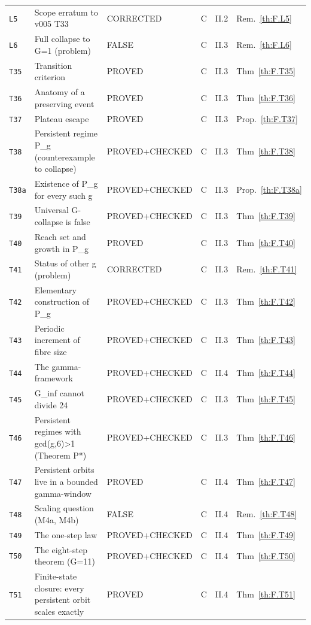 \begin{longtable}{@{}p{13mm}p{45mm}p{33mm}p{8mm}p{12mm}p{17mm}@{}}
\texttt{L5} & Scope erratum to v005 T33 & CORRECTED & C & II.2 & Rem.~\ref{th:F.L5} \\
\texttt{L6} & Full collapse to G=1 (problem) & FALSE & C & II.3 & Rem.~\ref{th:F.L6} \\
\texttt{T35} & Transition criterion & PROVED & C & II.3 & Thm~\ref{th:F.T35} \\
\texttt{T36} & Anatomy of a preserving event & PROVED & C & II.3 & Thm~\ref{th:F.T36} \\
\texttt{T37} & Plateau escape & PROVED & C & II.3 & Prop.~\ref{th:F.T37} \\
\texttt{T38} & Persistent regime P\_g (counterexample to collapse) & PROVED+CHECKED & C & II.3 & Thm~\ref{th:F.T38} \\
\texttt{T38a} & Existence of P\_g for every such g & PROVED+CHECKED & C & II.3 & Prop.~\ref{th:F.T38a} \\
\texttt{T39} & Universal G-collapse is false & PROVED+CHECKED & C & II.3 & Thm~\ref{th:F.T39} \\
\texttt{T40} & Reach set and growth in P\_g & PROVED & C & II.3 & Thm~\ref{th:F.T40} \\
\texttt{T41} & Status of other g (problem) & CORRECTED & C & II.3 & Rem.~\ref{th:F.T41} \\
\texttt{T42} & Elementary construction of P\_g & PROVED+CHECKED & C & II.3 & Thm~\ref{th:F.T42} \\
\texttt{T43} & Periodic increment of fibre size & PROVED+CHECKED & C & II.3 & Thm~\ref{th:F.T43} \\
\texttt{T44} & The gamma-framework & PROVED+CHECKED & C & II.4 & Thm~\ref{th:F.T44} \\
\texttt{T45} & G\_inf cannot divide 24 & PROVED+CHECKED & C & II.3 & Thm~\ref{th:F.T45} \\
\texttt{T46} & Persistent regimes with gcd(g,6)>1 (Theorem P*) & PROVED+CHECKED & C & II.3 & Thm~\ref{th:F.T46} \\
\texttt{T47} & Persistent orbits live in a bounded gamma-window & PROVED & C & II.4 & Thm~\ref{th:F.T47} \\
\texttt{T48} & Scaling question (M4a, M4b) & FALSE & C & II.4 & Rem.~\ref{th:F.T48} \\
\texttt{T49} & The one-step law & PROVED+CHECKED & C & II.4 & Thm~\ref{th:F.T49} \\
\texttt{T50} & The eight-step theorem (G=11) & PROVED+CHECKED & C & II.4 & Thm~\ref{th:F.T50} \\
\texttt{T51} & Finite-state closure: every persistent orbit scales exactly & PROVED & C & II.4 & Thm~\ref{th:F.T51} \\

\end{longtable}
